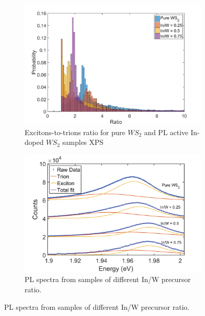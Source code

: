 \begin{figure}[H]
	\begin{center}
	\begin{subfigure}[b]{0.7\textwidth}
		\includegraphics[width=\textwidth]{In/PLRatioHistogram.png}
		\caption{Excitons-to-trions ratio for pure $WS_2$ and PL active In-doped $WS_2$ samples XPS}
		\label{fig:InPLRatioHistogram}
	\end{subfigure}
	\qquad
	\begin{subfigure}[b]{0.7\textwidth}
		\includegraphics[width=\textwidth]{In/allplotsfitted.png}
		\caption{PL spectra from samples of different In/W precursor ratio.}
		\label{fig:InPLRatioPlots}
	\end{subfigure}
	\end{center}
\end{figure}

